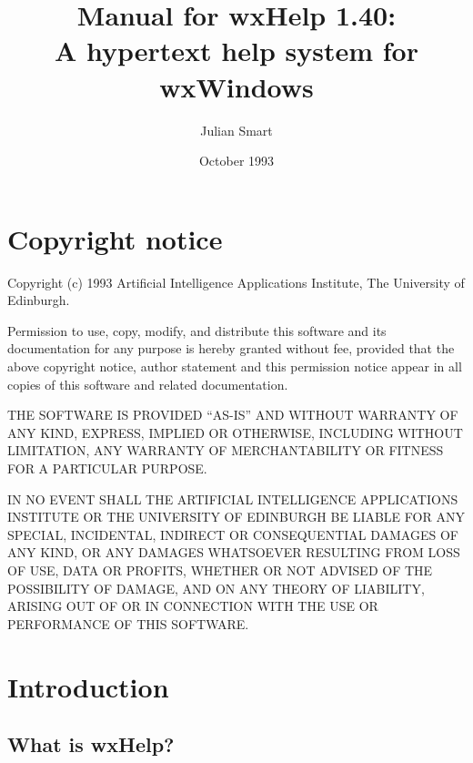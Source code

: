 %
\title{Manual for wxHelp 1.40:\\A hypertext help system for wxWindows}%
\author{Julian Smart}%
\date{October 1993}%
\parskip=10pt
\makeindex
%

\maketitle

\pagestyle{fancyplain}

\setfooter{\thepage}{}{}{}{}{\thepage}
\tableofcontents%

\chapter*{Copyright notice}
%
\setfooter{\thepage}{}{}{}{}{\thepage}

Copyright (c) 1993 Artificial Intelligence Applications Institute,
The University of Edinburgh.

Permission to use, copy, modify, and distribute this software and its
documentation for any purpose is hereby granted without fee, provided that the
above copyright notice, author statement and this permission notice appear in
all copies of this software and related documentation.

THE SOFTWARE IS PROVIDED ``AS-IS'' AND WITHOUT WARRANTY OF ANY KIND, EXPRESS,
IMPLIED OR OTHERWISE, INCLUDING WITHOUT LIMITATION, ANY WARRANTY OF
MERCHANTABILITY OR FITNESS FOR A PARTICULAR PURPOSE.

IN NO EVENT SHALL THE ARTIFICIAL INTELLIGENCE APPLICATIONS INSTITUTE OR THE
UNIVERSITY OF EDINBURGH BE LIABLE FOR ANY SPECIAL, INCIDENTAL, INDIRECT OR
CONSEQUENTIAL DAMAGES OF ANY KIND, OR ANY DAMAGES WHATSOEVER RESULTING FROM
LOSS OF USE, DATA OR PROFITS, WHETHER OR NOT ADVISED OF THE POSSIBILITY OF
DAMAGE, AND ON ANY THEORY OF LIABILITY, ARISING OUT OF OR IN CONNECTION WITH
THE USE OR PERFORMANCE OF THIS SOFTWARE.

\chapter{Introduction}
%
%
\setfooter{\thepage}{}{}{}{}{\thepage}

\section{What is wxHelp?}

